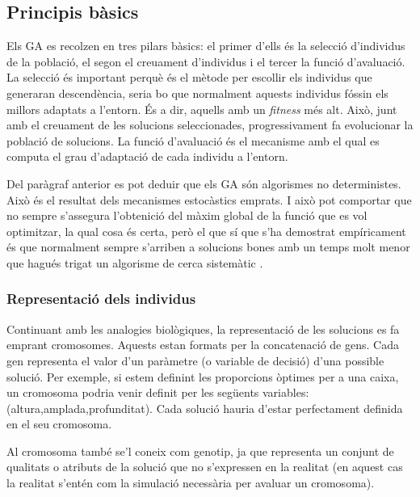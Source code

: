 \documentclass[titlepage,a4paper,12pt]{book}
\begin{document}
\subsection{Principis bàsics}

Els GA es recolzen en tres pilars bàsics: el primer d'ells és la selecció
d'individus de la població, el segon el creuament d'individus i el tercer la
funció d'avaluació. La selecció és important perquè és el mètode per escollir
els individus que generaran descendència, seria bo que normalment aquests
individus fóssin els millors adaptats a l'entorn. És a dir, aquells amb un
\emph{fitness} més alt.  Això, junt amb el creuament de les solucions
seleccionades, progressivament fa evolucionar la població de solucions. La
funció d'avaluació és el mecanisme amb el qual es computa el grau d'adaptació de
cada individu a l'entorn.

Del paràgraf anterior es pot deduir que els GA són algorismes no deterministes.
Això és el resultat dels mecanismes estocàstics emprats. I això pot comportar
que no sempre s'assegura l'obtenició del màxim global de la funció que es vol
optimitzar, la qual cosa és certa, però el que sí que s'ha demostrat
empíricament és que normalment sempre s'arriben a solucions bones amb un temps
molt menor que hagués trigat un algorisme de cerca sistemàtic \cite{BBM93}. 

\subsubsection{Representació dels individus}

Continuant amb les analogies biològiques, la representació de les solucions es
fa emprant cromosomes. Aquests estan formats per la concatenació de gens. Cada
gen representa el valor d'un paràmetre (o variable de decisió) d'una possible
solució.  Per exemple, si estem definint les proporcions òptimes per a una
caixa, un cromosoma podria venir definit per les següents variables:
(altura,amplada,profunditat). Cada solució hauria d'estar perfectament definida
en el seu cromosoma.

Al cromosoma també se'l coneix com genotip, ja que representa un conjunt de
qualitats o atributs de la solució que no s'expressen en la realitat (en aquest
cas la realitat s'entén com la simulació necessària per avaluar un cromosoma).


\end{document}

